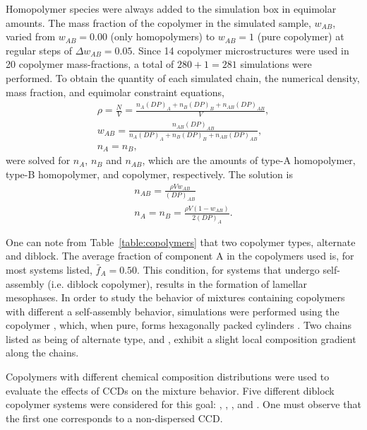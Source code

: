 \documentclass[
aip,
jcp,
reprint,
]{revtex4-1}
\begin{document}
Homopolymer species were always added to the simulation box in equimolar amounts.
The mass fraction of the copolymer in the simulated sample, $w_{AB}$, varied from $w_{AB} = 0.00$ (only homopolymers) to $w_{AB} = 1$ (pure copolymer) at regular steps of $\Delta w_{AB} = 0.05$.
Since 14 copolymer microstructures were used in 20 copolymer mass-fractions, a total of $280 + 1 = 281$ simulations were performed.
To obtain the quantity of each simulated chain, the numerical density, mass fraction, and equimolar constraint equations,
\begin{gather}
\rho = \frac{N}{V} = \frac{n_A(DP)_A+n_B(DP)_B+n_{AB}(DP)_{AB}}{V}, \\
w_{AB} = \frac{n_{AB}(DP)_{AB}}{n_A(DP)_A+n_B(DP)_B+n_{AB}(DP)_{AB}}, \\
n_A = n_B,
\end{gather}
were solved for $n_A$, $n_B$ and $n_{AB}$, which are the amounts of type-A homopolymer, type-B homopolymer, and copolymer, respectively.
The solution is
\begin{gather}
n_{AB} = \frac{\rho V w_{AB}}{(DP)_{AB}}\\
n_A = n_B = \frac{\rho V (1 - w_{AB})}{2 (DP)_A}.
\end{gather}

One can note from Table~\ref{table:copolymers} that two copolymer types, alternate and diblock.
The average fraction of component A in the copolymers used is, for most systems listed, $\bar{f}_A = 0.50 $.
This condition, for systems that undergo self-assembly (i.e. diblock copolymer), results in the formation of lamellar mesophases. 
In order to study the behavior of mixtures containing copolymers with different a self-assembly behavior, simulations were performed using the copolymer , which, when pure, forms hexagonally packed cylinders \cite{Groot_1998, Bates_1990, Gavrilov_2013, Lemos_2020}.
Two chains listed as being of alternate type,  and , exhibit a slight local composition gradient along the chains.

Copolymers with different chemical composition distributions were used to evaluate the effects of CCDs on the mixture behavior.
Five different diblock copolymer systems were considered for this goal: , , ,  and .
One must observe that the first one corresponds to a non-dispersed CCD.
\end{document}
